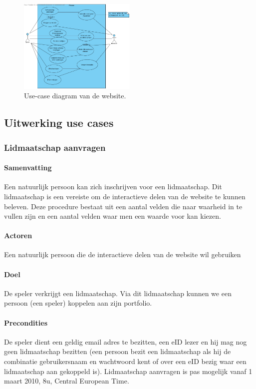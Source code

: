 
\begin{figure}[h!]
	\centering
		\includegraphics[width=0.5\textwidth]{images/analyse/ucd_website}
	\caption{Use-case diagram van de website.}
\end{figure}

\subsection{Uitwerking use cases}


\subsubsection{Lidmaatschap aanvragen}
\paragraph{Samenvatting}Een natuurlijk persoon kan zich inschrijven voor een lidmaatschap. Dit lidmaatschap is een vereiste om de interactieve delen van de website te kunnen beleven. Deze procedure bestaat uit een aantal velden die naar waarheid in te vullen zijn en een aantal velden waar men een waarde voor kan kiezen.
\paragraph{Actoren}Een natuurlijk persoon die de interactieve delen van de website wil gebruiken
\paragraph{Doel}De speler verkrijgt een lidmaatschap. Via dit lidmaatschap kunnen we een persoon (een speler) koppelen aan zijn portfolio.
\paragraph{Precondities}De speler dient een geldig email adres te bezitten, een eID lezer en hij mag nog geen lidmaatschap bezitten (een persoon bezit een lidmaatschap als hij de combinatie gebruikersnaam en wachtwoord kent of over een eID bezig waar een lidmaatschap aan gekoppeld is). \small{Lidmaatschap aanvragen is pas mogelijk vanaf 1 maart 2010, 8u, Central European Time.}

